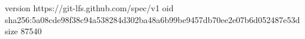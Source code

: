 version https://git-lfs.github.com/spec/v1
oid sha256:5a08cde98f38c94a538284d302ba48a6b99be9457db70ee2e07b6d052487e53d
size 87540
